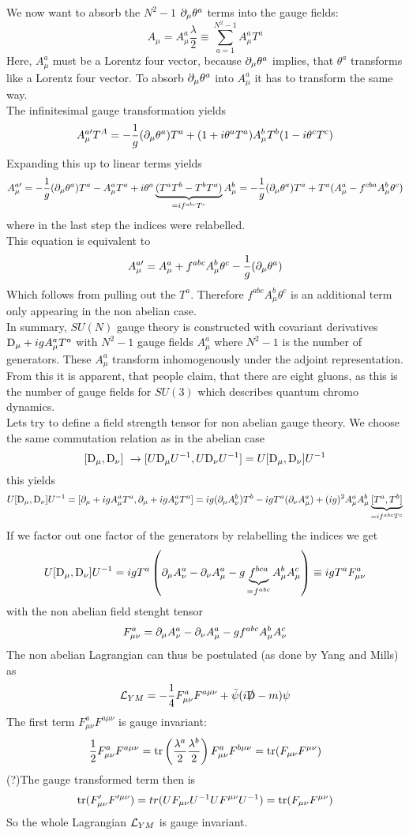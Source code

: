 We now want to absorb the $N^2-1$ $\partial_\mu \theta^a$ terms into the gauge fields:
\[ A_\mu = A_\mu ^a \frac{\lambda}{2} \equiv \sum_{a = 1}^{N^2 -1} A_\mu^a T^a\]
Here, $A_\mu^a$ must be a Lorentz four vector, because $\partial_\mu \theta^a$ implies, that $\theta^a$ transforms like a Lorentz four vector. To absorb $\partial_\mu \theta^a$ into $A_\mu^a$ it has to transform the same way.\\
The infinitesimal gauge transformation yields
\[ A_\mu^{a\prime} T^A = - \frac{1}{g} ( \partial_\mu \theta^a) T^a + ( 1 + i \theta^a T^a) A_\mu^b T^b ( 1-i \theta^c T^c)\]
Expanding this up to linear terms yields
\[ A_\mu^{a\prime} = - \frac{1}{g} ( \partial_\mu \theta^a) T^a - A_\mu^a T^a + i \theta^a\underbrace{( T^a T^b - T^b T^a)}_{= i f^{abc}T^c} A_\mu^b = -\frac{1}{g} (\partial_\mu \theta^a)T^a + T^a( A_\mu^a - f^{cba} A_\mu^b \theta^c)\]
where in the last step the indices were relabelled.\\
This equation is equivalent to
\[ A_\mu^{a\prime} = A_\mu^a + f^{abc} A_\mu^b \theta^c - \frac{1}{g}(\partial_\mu \theta^a)\]
Which follows from pulling out the $T^a$. Therefore $f^{abc}A_\mu^b \theta^c$ is an additional term only appearing in the non abelian case.\\
In summary, $SU(N)$ gauge theory is constructed with covariant derivatives ${\rm D}_\mu + igA_\mu^a T^a$ with $N^2-1$ gauge fields $A_\mu^a$ where $N^2-1$ is the number of generators. These $A_\mu^a$ transform inhomogenously under the adjoint representation. From this it is apparent, that people claim, that there are eight gluons, as this is the number of gauge fields for $SU(3)$ which describes quantum chromo dynamics.\\
Lets try to define a field strength tensor for non abelian gauge theory. We choose the same commutation relation as in the abelian case
\[ [{\rm D}_\mu, {\rm D}_\nu] ~\rightarrow [ U {\rm D}_\mu U^{-1}, U{\rm D}_\nu U^{-1}] = U [ {\rm D}_\mu, {\rm D}_\nu]U^{-1}\]
this yields
\[ U [ {\rm D}_\mu, {\rm D}_\nu]U^{-1} = [ \partial_\mu + i g A_\mu^a T^a, \partial_\mu + i gA_\nu^aT^a] = ig ( \partial_\mu A_\nu^b)T^b - igT^a(\partial_\nu A_\mu^a) + (ig)^2 A_\mu ^a A_\mu^b \underbrace{[T^a, T^b]}_{= i f^{abc} T^c}\]
If we factor out one factor of the generators by relabelling the indices we get
\[ U [ {\rm D}_\mu, {\rm D}_\nu]U^{-1} = i gT^a \left( \partial_\mu A_\nu^a - \partial_\nu A_\mu^a - g \underbrace{f^{bca}}_{= f^{abc}}A_\mu^b A_\mu^c\right) \equiv i g T^a F^a_{\mu\nu}\]
with the non abelian field stenght tensor
\[ F^a_{\mu\nu} = \partial_\mu A^a_\nu - \partial_\nu A_\mu^a - gf^{abc} A_\mu^b A_\nu^c\]
The non abelian Lagrangian can thus be postulated (as done by Yang and Mills) as
\[ \LL_{YM} = - \frac{1}{4} F_{\mu\nu}^a F^{a\mu\nu} + \bar{\psi}(i \slashed{\Dd} - m ) \psi\]
The first term $F^a_{\mu\nu}F^{a\mu\nu}$ is gauge invariant:
\[ \frac{1}{2} F_{\mu\nu}^a F^{a\mu\nu} = {\rm tr}\left( \frac{\lambda^a}{2}\frac{\lambda^b}{2}\right) F_{\mu\nu}^aF^{b\mu\nu} = {\rm tr}( F_{\mu\nu}F^{\mu\nu})\]
(?)The gauge transformed term then is
\[{\rm tr}(F_{\mu\nu}'F^{\prime\mu\nu}) = tr( U F_{\mu\nu}U^{-1}UF^{\mu\nu}U^{-1}) = {\rm tr}(F_{\mu\nu}F^{\mu\nu})\]
So the whole Lagrangian $\mathcal{L}_{YM}$ is gauge invariant. 

